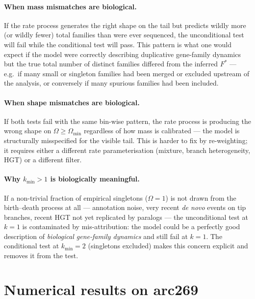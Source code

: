\documentclass[11pt]{article}
\newcommand{\1}{\mathbf{1}}
\newcommand{\Om}{\Omega}
\theoremstyle{definition}
\begin{document}
\paragraph{When mass mismatches are biological.}
If the rate process generates the right shape on the tail but
predicts wildly more (or wildly fewer) total families than were ever
sequenced, the unconditional test will fail while the conditional
test will pass. This pattern is what one would expect if the model
were correctly describing duplicative gene-family dynamics but the
true total number of distinct families differed from the inferred
$F^*$ --- e.g.\ if many small or singleton families had been merged
or excluded upstream of the analysis, or conversely if many
spurious families had been included.

\paragraph{When shape mismatches are biological.}
If both tests fail with the same bin-wise pattern, the rate process
is producing the wrong shape on $\Om\ge\Om_{\min}$ regardless of how
mass is calibrated --- the model is structurally misspecified for
the visible tail. This is harder to fix by re-weighting; it requires
either a different rate parameterisation (mixture, branch
heterogeneity, HGT) or a different filter.

\paragraph{Why $k_{\min} > 1$ is biologically meaningful.}
If a non-trivial fraction of empirical singletons ($\Om = 1$) is not
drawn from the birth--death process at all --- annotation noise, very
recent \emph{de novo} events on tip branches, recent HGT not yet
replicated by paralogs --- the unconditional test at $k=1$ is
contaminated by mis-attribution: the model could be a perfectly good
description of \emph{biological gene-family dynamics} and still fail
at $k=1$. The conditional test at $k_{\min} = 2$ (singletons
excluded) makes this concern explicit and removes it from the test.

\section{Numerical results on arc269}
\label{sec:arc269}
\end{document}
